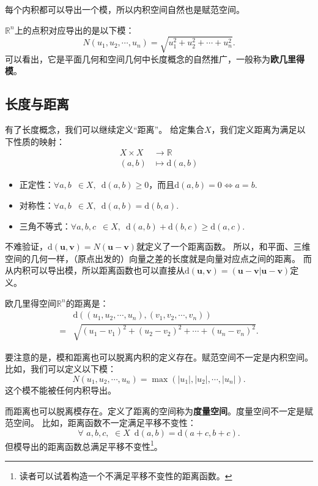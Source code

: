 \documentclass[12pt,UTF8]{ctexbook}
\begin{document}
每个内积都可以导出一个模，所以内积空间自然也是赋范空间。

$\mathbb{R}^n$上的点积对应导出的是以下模：
$$ N(u_1, u_2, \cdots , u_n) = \sqrt{u_1^2 + u_2^2 + \cdots + u_n^2}. $$
可以看出，它是平面几何和空间几何中长度概念的自然推广，一般称为\textbf{欧几里得模}。

\subsection{长度与距离}
有了长度概念，我们可以继续定义“距离”。
给定集合$X$，我们定义距离为满足以下性质的映射：
\begin{align*}
    X \times X &\rightarrow \mathbb{R}  \\
   (a, b) &\mapsto \mathrm{d}(a, b)
\end{align*}
\begin{itemize}
    \item 正定性：$ \forall a, b \,\,\, \in X, \,\,\, \mathrm{d}(a, b) \geqslant 0$，而且$\mathrm{d}(a, b) = 0 \Leftrightarrow a = b.$
    \item 对称性：$ \forall a, b \,\,\, \in X, \,\,\, \mathrm{d}(a, b) = \mathrm{d}(b, a).$
    \item 三角不等式：$ \forall a, b, c \,\,\, \in X, \,\,\, \mathrm{d}(a, b) + \mathrm{d}(b, c) \geqslant \mathrm{d}(a, c).$
\end{itemize}
不难验证，$\mathrm{d}(\mathbf{u}, \mathbf{v}) = N(\mathbf{u} - \mathbf{v})$就定义了一个距离函数。
所以，和平面、三维空间的几何一样，（原点出发的）向量之差的长度就是向量对应点之间的距离。
而从内积可以导出模，所以距离函数也可以直接从$\mathrm{d}(\mathbf{u}, \mathbf{v}) = (\mathbf{u} - \mathbf{v}|\mathbf{u} - \mathbf{v})$定义。

欧几里得空间$\mathbb{R}^n$的距离是：
\begin{align*}
    &\mathrm{d}\left((u_1, u_2, \cdots , u_n), (v_1, v_2, \cdots , v_n) \right)  \\
  = &\sqrt{(u_1-v_1)^2 + (u_2-v_2)^2 + \cdots + (u_n-v_n)^2}. 
\end{align*}

要注意的是，模和距离也可以脱离内积的定义存在。赋范空间不一定是内积空间。
比如，我们可以定义以下模：
$$ N(u_1, u_2, \cdots , u_n) = \max\left(|u_1|, |u_2|, \cdots, |u_n|\right). $$
这个模不能被任何内积导出。

而距离也可以脱离模存在。定义了距离的空间称为\textbf{度量空间}。度量空间不一定是赋范空间。
比如，距离函数不一定满足平移不变性：
$$ \forall \,\, a, b, c, \,\, \in X \,\,\, \mathrm{d}(a, b) = \mathrm{d}(a + c, b + c). $$
但模导出的距离函数总满足平移不变性\footnote{读者可以试着构造一个不满足平移不变性的距离函数。}。
\end{document}
